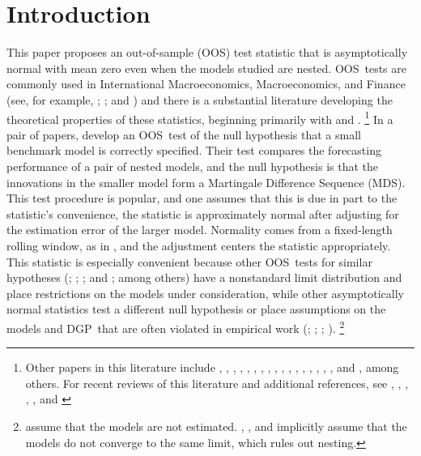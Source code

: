 \documentclass[12pt,fleqn]{article}
\theoremstyle{definition}
\newcommand{\dgp}{DGP}
\newcommand{\mds}{MDS}
\newcommand{\oos}{OOS}
\begin{document}
\section{Introduction} This paper proposes an out-of-sample (\oos)
test statistic that is asymptotically normal with mean zero even when
the models studied are nested.
\oos\ tests are commonly used in International Macroeconomics,
Macroeconomics, and Finance (see, for example, \citealt{MeR:83};
\citealt{StW:03}; and \citealt{GoW:08}) and there is a substantial
literature developing the theoretical properties of these statistics,
beginning primarily with \citet{DiM:95} and
\citet{Wes:96}.%
\footnote{Other papers in this literature include
  \citet{WeM:98}, \citet{Mcc:98,Mcc:00},
  \citet{ClM:01,ClM:05-2,ClM:05,ClM:11b,ClM:12,ClM:12b},
  \citet{CCS:01}, \citet{CoS:02,CoS:04,CoS:07}, \citet{Whi:00},
  \citet{InK:04,InK:06}, \citet{Han:05}, \citet{Ros:05},
  \citet{ClW:06,ClW:07}, \citet{Ana:07}, \citet{GiR:09,GiR:10},
  \citet{HuW:10}, \citet{HLN:11}, \cite{InR:11}, \cite{Pin:11},
  \cite{RoS:11,RoS:11b}, and \citet{Cal:11}, among others.  For recent
  reviews of this literature and additional references, see
  \citet{McW:02}, \citet{CoS:06}, \citet{Wes:06}, \citet{ClM:11c},
  \citet{CoD:11}, and \citet{Gia:11}} %
In a pair of papers,
\citet{ClW:06,ClW:07} develop an \oos\ test of the null hypothesis
that a small benchmark model is correctly specified.  Their test
compares the forecasting performance of a pair of nested models, and
the null hypothesis is that the innovations in the smaller model form
a Martingale Difference Sequence (\mds).  This test procedure is popular, and
one assumes that this is due in part to the statistic's convenience,
the statistic is approximately normal after adjusting for the
estimation error of the larger model.  Normality comes from a
fixed-length rolling window, as in \citet{GiW:06}, and the adjustment
centers the statistic appropriately.  This statistic is especially
convenient because other \oos\ tests for similar hypotheses
(\citealt{CCS:01}; \citealt{ClM:01,ClM:05}; \citealt{CoS:02,CoS:04};
and \citealt{Mcc:07}; among others) have a nonstandard limit
distribution and place restrictions on the models under consideration,
while other asymptotically normal statistics test a different null
hypothesis \citep{GiW:06} or place assumptions on the models and \dgp\
that are often violated in empirical work (\citealt{DiM:95};
\citealt{Wes:96}; \citealt{WeM:98};
\citealt{Mcc:00}).%
\footnote{\citet{DiM:95} assume that the models are
  not estimated. \citet{Wes:96}, \citet{WeM:98}, and \citet{Mcc:00}
  implicitly assume that the models do not converge to the same limit,
  which rules out nesting.} %
\end{document}

